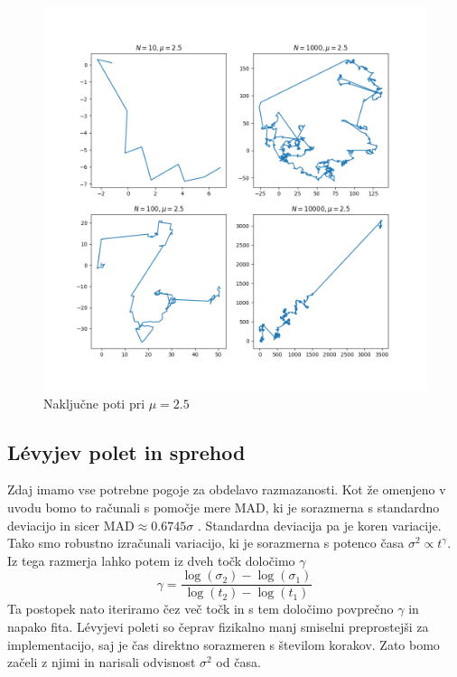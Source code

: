 \documentclass{article}
\newcommand{\MAD}{\mathrm{MAD}}
\begin{document}
\begin{figure}[H]
  \centering
  \includegraphics[width=1\textwidth]{nice_plots.png} 
  \caption{Naključne poti pri $\mu = 2.5$}
\end{figure}

\subsection{L\'evyjev polet in sprehod}
Zdaj imamo vse potrebne pogoje za obdelavo razmazanosti. Kot že omenjeno v uvodu bomo to računali s pomočje mere MAD, ki je sorazmerna s standardno deviacijo in sicer $\MAD \approx 0.6745 \sigma$ \cite{wiki}. Standardna deviacija pa je koren variacije. Tako smo robustno izračunali variacijo, ki je sorazmerna s potenco časa $\sigma^2 \propto t^\gamma$. Iz tega razmerja lahko potem iz dveh točk določimo $\gamma$
\begin{equation*}
  \gamma = \frac{\log(\sigma_2) - \log(\sigma_1)}{\log(t_2) - \log(t_1)}
\end{equation*}
Ta postopek nato iteriramo čez več točk in s tem določimo povprečno $\gamma$ in napako fita. L\'evyjevi poleti so čeprav fizikalno manj smiselni preprostejši za implementacijo, saj je čas direktno sorazmeren s številom korakov. Zato bomo začeli z njimi in narisali  odvisnost $\sigma^2$ od časa. 
\end{document}
